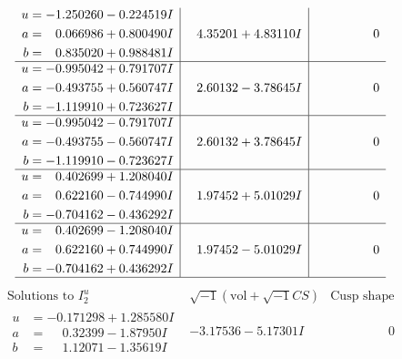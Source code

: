 \documentclass[1p]{elsarticle_modified}
\theoremstyle{definition}
\newcommand{\I}{\sqrt{-1}}
\begin{document}
$$\begin{array}{c|c|c}
\begin{aligned}
u &= -1.250260 - 0.224519 I \\
a &= \phantom{-}0.066986 + 0.800490 I \\
b &= \phantom{-}0.835020 + 0.988481 I\end{aligned}
 & \phantom{-}4.35201 + 4.83110 I & \phantom{-0.000000 } 0 \\ \hline\begin{aligned}
u &= -0.995042 + 0.791707 I \\
a &= -0.493755 + 0.560747 I \\
b &= -1.119910 + 0.723627 I\end{aligned}
 & \phantom{-}2.60132 - 3.78645 I & \phantom{-0.000000 } 0 \\ \hline\begin{aligned}
u &= -0.995042 - 0.791707 I \\
a &= -0.493755 - 0.560747 I \\
b &= -1.119910 - 0.723627 I\end{aligned}
 & \phantom{-}2.60132 + 3.78645 I & \phantom{-0.000000 } 0 \\ \hline\begin{aligned}
u &= \phantom{-}0.402699 + 1.208040 I \\
a &= \phantom{-}0.622160 - 0.744990 I \\
b &= -0.704162 - 0.436292 I\end{aligned}
 & \phantom{-}1.97452 + 5.01029 I & \phantom{-0.000000 } 0 \\ \hline\begin{aligned}
u &= \phantom{-}0.402699 - 1.208040 I \\
a &= \phantom{-}0.622160 + 0.744990 I \\
b &= -0.704162 + 0.436292 I\end{aligned}
 & \phantom{-}1.97452 - 5.01029 I & \phantom{-0.000000 } 0\\
 \hline 
 \end{array}$$\newpage$$\begin{array}{c|c|c}  
\text{Solutions to }I^u_{2}& \I (\text{vol} + \sqrt{-1}CS) & \text{Cusp shape}\\
 \hline 
\begin{aligned}
u &= -0.171298 + 1.285580 I \\
a &= \phantom{-}0.32399 - 1.87950 I \\
b &= \phantom{-}1.12071 - 1.35619 I\end{aligned}
 & -3.17536 - 5.17301 I & \phantom{-0.000000 } 0 \\ \hline\begin{aligned}

\end{aligned}
\end{array}$$
\end{document}
